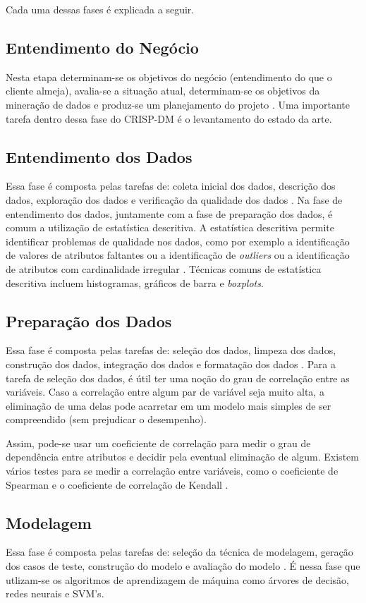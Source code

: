 Cada uma dessas fases é explicada a seguir.

\subsection{Entendimento do Negócio}
Nesta etapa determinam-se os objetivos do negócio (entendimento do que o cliente
almeja), avalia-se a situação atual, determinam-se os objetivos da mineração de dados
e produz-se um planejamento do projeto \cite{crispdm}. Uma importante tarefa dentro
dessa fase do CRISP-DM é o levantamento do estado da arte. 

\subsection{Entendimento dos Dados}
Essa fase é composta pelas tarefas de: coleta inicial dos dados, descrição dos dados,
exploração dos dados e verificação da qualidade dos dados \cite{crispdm}.
Na fase de entendimento dos dados, juntamente com a fase de preparação dos dados, 
é comum a utilização de estatística descritiva. A
estatística descritiva permite identificar problemas de qualidade nos dados, como por
exemplo a identificação de valores de atributos faltantes ou a identificação de
\textit{outliers} ou a identificação de atributos com cardinalidade irregular
\cite{ml_book}. Técnicas comuns de estatística descritiva incluem histogramas,
gráficos de barra e \textit{boxplots}. 

\subsection{Preparação dos Dados}
Essa fase é composta pelas tarefas de: seleção dos dados, limpeza dos dados, construção
dos dados, integração dos dados e formatação dos dados \cite{crispdm}. Para a tarefa
de seleção dos dados, é útil ter uma noção do grau de correlação entre as variáveis. 
Caso a correlação entre algum par de variável seja muito alta, a eliminação de uma
delas pode acarretar em um modelo mais simples de ser compreendido (sem prejudicar o
desempenho).
\par Assim, pode-se usar um coeficiente de correlação para medir o grau de dependência
entre atributos e decidir pela eventual eliminação de algum. Existem vários testes
para se medir a correlação entre variáveis, como o coeficiente de Spearman e o
coeficiente de correlação de Kendall \cite{kendall}. 

\subsection{Modelagem} 
Essa fase é composta pelas tarefas de: seleção da técnica de modelagem, geração dos
casos de teste, construção do modelo e avaliação do modelo \cite{crispdm}. É nessa
fase que utlizam-se os algoritmos de aprendizagem de máquina como árvores de decisão,
redes neurais e SVM's. 

